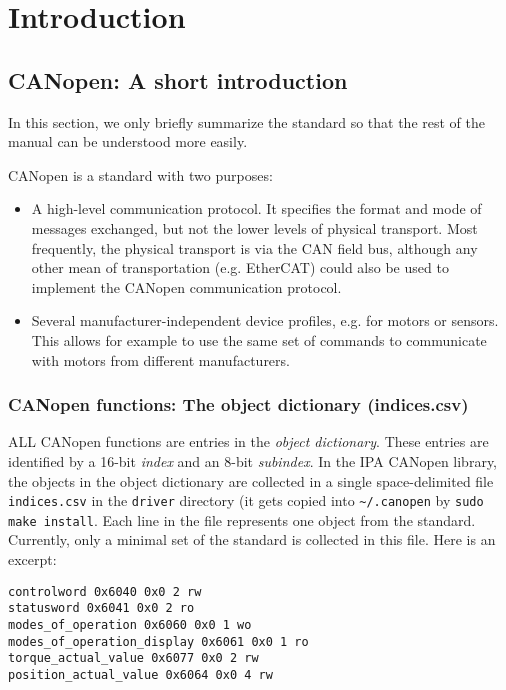 \chapter{Introduction}
\label{chap:introduction}

\section{CANopen: A short introduction}

In this section, we only briefly summarize the standard so that the rest of the manual can be understood more easily.

CANopen is a standard with two purposes:
\begin{itemize}
\item A high-level communication protocol. It specifies the format and mode of messages exchanged, but not the lower levels of physical transport. Most frequently, the physical transport is via the CAN field bus, although any other mean of transportation (e.g. EtherCAT) could also be used to implement the CANopen communication protocol.
\item Several manufacturer-independent device profiles, e.g. for motors or sensors. This allows for example to use the same set of commands to communicate with motors from different manufacturers.
\end{itemize}

\subsection{CANopen functions: The object dictionary (indices.csv)}
\label{sec:objectdictionary}

ALL CANopen functions are entries in the {\em object dictionary}. These entries are identified by a 16-bit {\em index} and an 8-bit {\em subindex}. In the IPA CANopen library, the objects in the object dictionary are collected in a single space-delimited file \texttt{indices.csv} in the \texttt{driver} directory (it gets copied into \texttt{\textasciitilde/.canopen} by \texttt{sudo make install}. Each line in the file represents one object from the standard. Currently, only a minimal set of the standard is collected in this file. Here is an excerpt:

\begin{verbatim}
controlword 0x6040 0x0 2 rw
statusword 0x6041 0x0 2 ro
modes_of_operation 0x6060 0x0 1 wo
modes_of_operation_display 0x6061 0x0 1 ro
torque_actual_value 0x6077 0x0 2 rw
position_actual_value 0x6064 0x0 4 rw
\end{verbatim}

